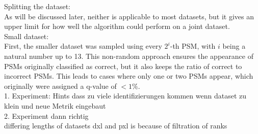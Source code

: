 Splitting the dataset:\\
As will be discussed later, neither is applicable to most datasets, but it gives an upper limit for how well the algorithm could perform on a joint dataset. \\
Small dataset:\\
First, the smaller dataset was sampled using every $2^i$-th PSM, with $i$ being a natural number up to 13. This non-random approach ensures the appearance of PSMs originally classified as correct, but it also keeps the ratio of correct to incorrect PSMs. This leads to cases where only one or two PSMs appear, which originally were assigned a q-value of $<1\%$. \\
1. Experiment: Hints dass zu viele identifizierungen kommen wenn dataset zu klein und neue Metrik eingebaut\\
2. Experiment dann richtig\\
differing lengths of datasets dxl and pxl is because of filtration of ranks\\

